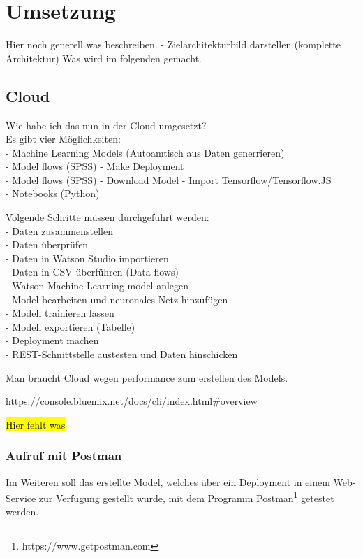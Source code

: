 \section{Umsetzung}
Hier noch generell was beschreiben. - Zielarchitekturbild darstellen (komplette Architektur)
Was wird im folgenden gemacht.

\subsection{Cloud}
Wie habe ich das nun in der Cloud umgesetzt?\\
Es gibt vier Möglichkeiten:\\
- Machine Learning Models (Autoamtisch aus Daten generrieren)\\
- Model flows (SPSS) - Make Deployment\\
- Model flows (SPSS) - Download Model - Import Tensorflow/Tensorflow.JS\\
- Notebooks (Python)

Volgende Schritte müssen durchgeführt werden:\\
- Daten zusammenstellen\\
- Daten überprüfen\\
- Daten in Watson Studio importieren\\
- Daten in CSV überführen (Data flows)\\
- Watson Machine Learning model anlegen\\
- Model bearbeiten und neuronales Netz hinzufügen\\
- Modell trainieren lassen\\
- Modell exportieren (Tabelle)\\
- Deployment machen\\
- REST-Schnittstelle austesten und Daten hinschicken

Man braucht Cloud wegen performance zum erstellen des Models.

\url{https://console.bluemix.net/docs/cli/index.html#overview}

\colorbox{yellow}{Hier fehlt was}

\subsubsection{Aufruf mit Postman}
\label{subsec:Aufruf mit Postman}
Im Weiteren soll das erstellte Model, welches über ein Deployment in einem Web-Service zur Verfügung gestellt wurde,
mit dem Programm Postman\footnote{https://www.getpostman.com} getestet werden.

